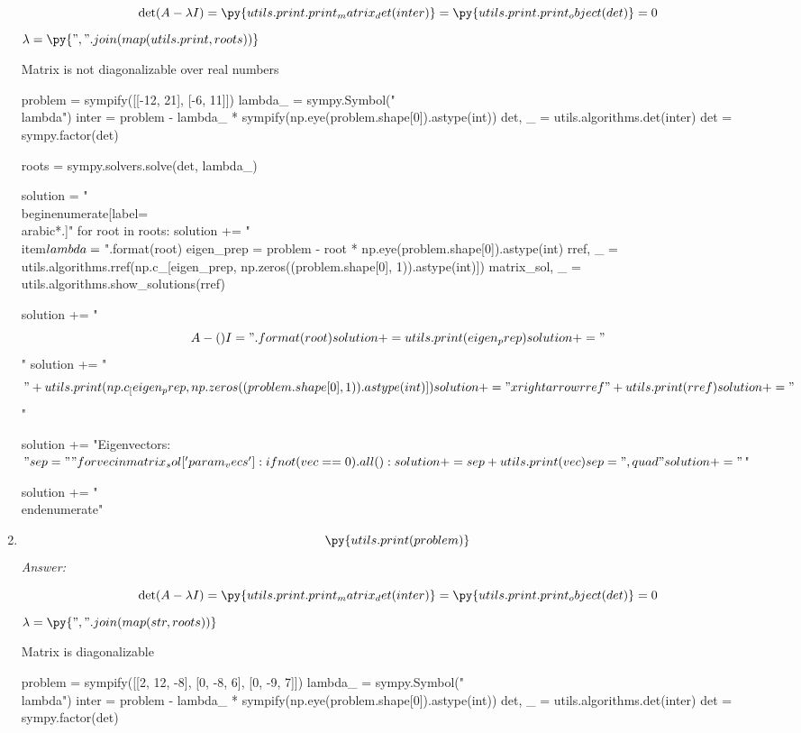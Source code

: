 \documentclass[letterpaper]{article}
\newcommand{\ans}{\textit{Answer: }}
\newenvironment{question}[2][Question]{\begin{trivlist}
\item[\hskip \labelsep {\bfseries #1}\hskip \labelsep {\bfseries #2.}]}{\end{trivlist}}
\newcommand{\printobj}[1]{\py{utils.print.print_object(#1)}}
\begin{document}
\begin{question}{5.5}
\begin{enumerate}[label=\textbf{(\alph*)}]
    $$\det(A - \lambda I) = \py{utils.print.print_matrix_det(inter)} = \printobj{det} = 0$$
    $\lambda = \py{", ".join(map(utils.print, roots))}$

    Matrix is not diagonalizable over real numbers
    \begin{pycode}
problem = sympify([[-12, 21], [-6, 11]])
lambda_ = sympy.Symbol("\\lambda")
inter = problem - lambda_ * sympify(np.eye(problem.shape[0]).astype(int))
det, _ = utils.algorithms.det(inter)
det = sympy.factor(det)

roots = sympy.solvers.solve(det, lambda_)

solution = "\\begin{enumerate}[label=\\arabic*.]\n"
for root in roots:
  solution += "\\item$\\lambda = {}$\n".format(root)
  eigen_prep = problem - root * np.eye(problem.shape[0]).astype(int)
  rref, _ = utils.algorithms.rref(np.c_[eigen_prep, np.zeros((problem.shape[0], 1)).astype(int)])
  matrix_sol, _ = utils.algorithms.show_solutions(rref)

  solution += "$$A - ({}) I = ".format(root)
  solution += utils.print(eigen_prep)
  solution += "$$\n"
  solution += "$$" + utils.print(np.c_[eigen_prep, np.zeros((problem.shape[0], 1)).astype(int)])
  solution += "\\xrightarrow{rref}" + utils.print(rref)
  solution += "$$\n"

  solution += "Eigenvectors: $"

  sep = ""
  for vec in matrix_sol['param_vecs']:
    if not (vec == 0).all():
      solution += sep + utils.print(vec)
      sep = ",\\quad"

  solution += "$\n"

solution += "\\end{enumerate}"

    \end{pycode}

    \item $$\py{utils.print(problem)}$$
    \ans

    $$\det(A - \lambda I) = \py{utils.print.print_matrix_det(inter)} = \printobj{det} = 0$$
    $\lambda = \py{", ".join(map(str, roots))}$


    Matrix is diagonalizable
    \begin{pycode}
problem = sympify([[2, 12, -8], [0, -8, 6], [0, -9, 7]])
lambda_ = sympy.Symbol("\\lambda")
inter = problem - lambda_ * sympify(np.eye(problem.shape[0]).astype(int))
det, _ = utils.algorithms.det(inter)
det = sympy.factor(det)


\end{pycode}
\end{enumerate}
\end{question}
\end{document}
